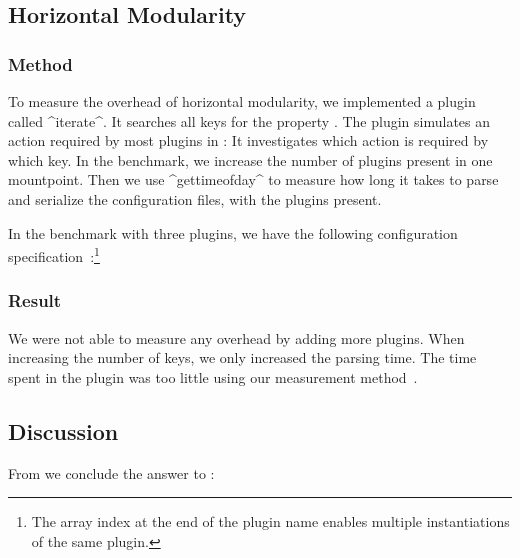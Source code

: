 \subsection{Horizontal Modularity}

\subsubsection{Method}

To measure the overhead of horizontal modularity, we implemented a plugin called ^iterate^.
It searches all keys for the property .
The plugin  simulates an action required by most plugins in \elektra{}:
It investigates which action is required by which key.
In the benchmark, we increase the number of plugins present in one mountpoint.
Then we use ^gettimeofday^ to measure how long it takes to parse and serialize the configuration files, with the plugins present.

\begin{example}
In the benchmark with three plugins, we have the following configuration specification~\cite{raab2016improving}:\footnote{The array index at the end of the plugin name enables multiple instantiations of the same plugin.}

\end{example}


\subsubsection{Result}

We were not able to measure any overhead by adding more plugins.
When increasing the number of keys, we only increased the parsing time.
The time spent in the plugin  was too little using our measurement method~\cite{raab2016improving}.

\subsection{Discussion}

From  we conclude the answer to :
\rqOverheadModularity*

